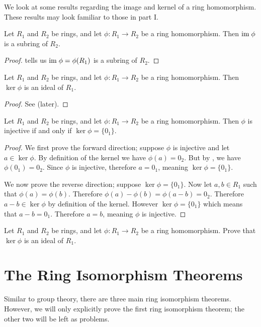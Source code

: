We look at some results regarding the image and kernel of a ring homomorphism. These results may look familiar to those in part I.
\begin{proposition}\label{prop-image-is-a-subring}
    Let $R_1$ and $R_2$ be rings, and let $\phi: R_1 \to R_2$ be a ring homomorphism. Then $\mathrm{im}\;\phi$ is a subring of $R_2$.
\end{proposition}
\begin{proof}
     tells us $\mathrm{im}\;\phi = \phi(R_1)$ is a subring of $R_2$.
\end{proof}

\begin{proposition}\label{prop-kernel-is-an-ideal}
    Let $R_1$ and $R_2$ be rings, and let $\phi: R_1 \to R_2$ be a ring homomorphism. Then $\ker\phi$ is an ideal of $R_1$.
\end{proposition}
\begin{proof}
    See  (later).
\end{proof}

\begin{proposition}
    Let $R_1$ and $R_2$ be rings, and let $\phi: R_1 \to R_2$ be a ring homomorphism. Then $\phi$ is injective if and only if $\ker\phi = \{0_1\}$.
\end{proposition}
\begin{proof}
    We first prove the forward direction; suppose $\phi$ is injective and let $a \in \ker\phi$. By definition of the kernel we have $\phi(a) = 0_2$. But by , we have $\phi(0_1) = 0_2$. Since $\phi$ is injective, therefore $a = 0_1$, meaning $\ker\phi = \{0_1\}$.

    We now prove the reverse direction; suppose $\ker\phi = \{0_1\}$. Now let $a,b \in R_1$ such that $\phi(a) = \phi(b)$. Therefore $\phi(a) - \phi(b) = \phi(a-b) = 0_2$. Therefore $a-b \in \ker\phi$ by definition of the kernel. However $\ker\phi = \{0_1\}$ which means that $a - b = 0_1$. Therefore $a = b$, meaning $\phi$ is injective.
\end{proof}

\begin{exercise}\label{exercise-kernel-is-an-ideal}
    Let $R_1$ and $R_2$ be rings, and let $\phi: R_1 \to R_2$ be a ring homomorphism. Prove that $\ker\phi$ is an ideal of $R_1$.
\end{exercise}

\section{The Ring Isomorphism Theorems}
Similar to group theory, there are three main ring isomorphism theorems. However, we will only explicitly prove the first ring isomorphism theorem; the other two will be left as problems.

